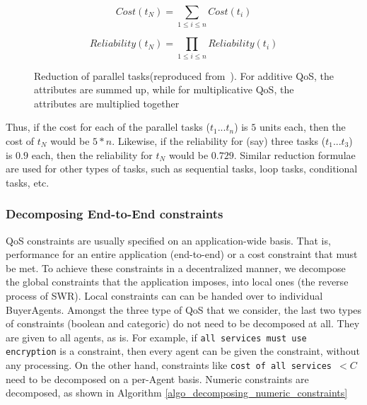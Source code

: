 \documentclass[10pt,journal,compsoc]{IEEEtran}
\begin{document}
\begin{equation}
Cost(t_{N}) = \sum_{1 \leq i \leq n} Cost(t_{i})
\end{equation}

\begin{equation}
Reliability(t_{N}) = \prod_{1 \leq i \leq n} Reliability(t_{i})
\end{equation}

\begin{figure}[h]
	\centering
	\caption{Reduction of parallel tasks(reproduced from~\cite{Cardoso2004Quality}). For additive QoS, the attributes are summed up, while for multiplicative QoS, the attributes are multiplied together\label{fig:parallel_reduction}}
\end{figure}

Thus, if the cost for each of the parallel tasks ($t_{1}...t_{n}$) is $5$ units each, then the cost of $t_{N}$ would be $5 * n$. Likewise, if the reliability for (say) three tasks ($t_{1}...t_{3}$) is $0.9$ each, then the reliability for $t_{N}$ would be $0.729$. Similar reduction formulae~\cite{Cardoso2004Quality} are used for other types of tasks, such as sequential tasks, loop tasks, conditional tasks, etc.


\subsubsection{Decomposing End-to-End constraints\label{decomposing_constraints}} QoS constraints are usually specified on an application-wide basis. That is, performance for an entire application (end-to-end) or a cost constraint that must be met. To achieve these constraints in a decentralized manner, we decompose the global constraints that the application imposes, into local ones (the reverse process of SWR). Local constraints can can be handed over to individual BuyerAgents. Amongst the three type of QoS that we consider, the last two types of constraints (boolean and categoric) do not need to be decomposed at all. They are given to all agents, as is. For example, if \texttt{all services must use encryption} is a constraint, then every agent can be given the constraint, without any processing. On the other hand, constraints like \texttt{cost of all services $< C$} need to be decomposed on a per-Agent basis. Numeric constraints are decomposed, as shown in Algorithm \ref{algo_decomposing_numeric_constraints}
\end{document}
